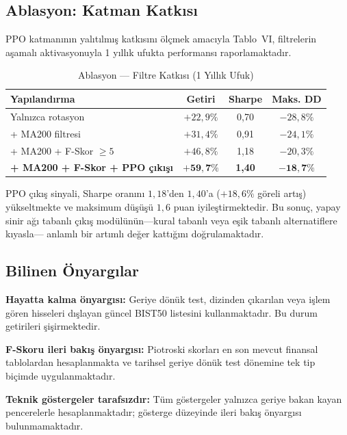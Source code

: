 \documentclass[journal]{IEEEtran}
\begin{document}
\subsection{Ablasyon: Katman Katkısı}

PPO katmanının yalıtılmış katkısını ölçmek amacıyla Tablo~VI,
filtrelerin aşamalı aktivasyonuyla 1 yıllık ufukta performansı
raporlamaktadır.

\begin{table}[ht]
\caption{Ablasyon — Filtre Katkısı (1 Yıllık Ufuk)}
\label{tab:ablation}
\centering
\renewcommand{\arraystretch}{1.15}
\begin{tabular}{lccc}
\toprule
\textbf{Yapılandırma} & \textbf{Getiri} & \textbf{Sharpe} & \textbf{Maks. DD} \\
\midrule
Yalnızca rotasyon            & $+22{,}9\%$ & 0,70 & $-28{,}8\%$ \\
+ MA200 filtresi             & $+31{,}4\%$ & 0,91 & $-24{,}1\%$ \\
+ MA200 + F-Skor $\geq 5$   & $+46{,}8\%$ & 1,18 & $-20{,}3\%$ \\
\textbf{+ MA200 + F-Skor + PPO çıkışı} & $\mathbf{+59{,}7\%}$ & \textbf{1,40} & $\mathbf{-18{,}7\%}$ \\
\bottomrule
\end{tabular}
\end{table}

PPO çıkış sinyali, Sharpe oranını $1{,}18$'den $1{,}40$'a
($+18{,}6\%$ göreli artış) yükseltmekte ve maksimum düşüşü $1{,}6$
puan iyileştirmektedir. Bu sonuç, yapay sinir ağı tabanlı çıkış
modülünün—kural tabanlı veya eşik tabanlı alternatiflere kıyasla—
anlamlı bir artımlı değer kattığını doğrulamaktadır.

\subsection{Bilinen Önyargılar}

\textbf{Hayatta kalma önyargısı:} Geriye dönük test, dizinden
çıkarılan veya işlem gören hisseleri dışlayan güncel BIST50 listesini
kullanmaktadır. Bu durum getirileri şişirmektedir.

\textbf{F-Skoru ileri bakış önyargısı:} Piotroski skorları en son
mevcut finansal tablolardan hesaplanmakta ve tarihsel geriye dönük
test dönemine tek tip biçimde uygulanmaktadır.

\textbf{Teknik göstergeler tarafsızdır:} Tüm göstergeler yalnızca
geriye bakan kayan pencerelerle hesaplanmaktadır; gösterge düzeyinde
ileri bakış önyargısı bulunmamaktadır.
\end{document}
